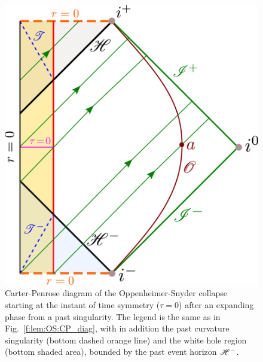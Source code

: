 \begin{figure}
\centerline{\includegraphics[height=0.35\textheight]{lem_OS_CP_diag_sym.pdf}}
\caption[]{\label{f:lem:OS:CP_diag_sym} \footnotesize
Carter-Penrose diagram of the Oppenheimer-Snyder collapse starting at
the instant of time symmetry ($\tau=0$) after an expanding phase from
a past singularity. The legend is the same as in Fig.~\ref{f:lem:OS:CP_diag},
with in addition the past curvature singularity (bottom dashed orange line)
and the white hole region (bottom shaded area), bounded by the past event
horizon $\mathscr{H}^-$.
}
\end{figure}

